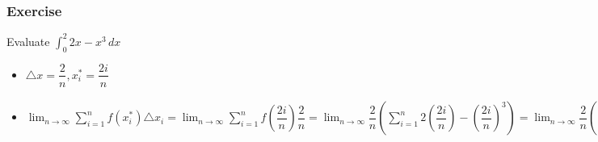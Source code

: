 \documentclass[t]{beamer}
\theoremstyle{plain}
\theoremstyle{definition}
\newcommand{\ds}{\displaystyle}
\begin{document}
\begin{frame}
\frametitle{Exercise}
\footnotesize
Evaluate $\ds\int_0^2 2x - x^3 \, dx$ \pause

\begin{itemize}
	\item $\triangle x = \dfrac{2}{n}, x_i^{*} = \dfrac{2i}{n}$
	\item $\ds \lim_{n\rightarrow \infty} \sum_{i=1}^{n} f(x_{i}^{*})\triangle x_{i} = \lim_{n\rightarrow \infty} \sum_{i=1}^{n} f(\dfrac{2i}{n}) \dfrac{2}{n} =  \lim_{n\rightarrow \infty} \dfrac{2}{n} \left( \sum_{i=1}^{n} 2(\dfrac{2i}{n}) - (\dfrac{2i}{n})^3\right) = \lim_{n\rightarrow \infty} \dfrac{2}{n} \left( \sum_{i=1}^{n} \dfrac{4i}{n} - \dfrac{8i^3}{n^3}\right) = \lim_{n\rightarrow \infty} \dfrac{2}{n} \left( \dfrac{4}{n}\sum_{i=1}^{n} i - \dfrac{8}{n^3}\sum_{i=1}^{n} i^3 \right) = \lim_{n\rightarrow \infty} \dfrac{2}{n} \left( \dfrac{4}{n} \cdot \dfrac{n(n+1)}{2} - \dfrac{8}{n^3} \cdot \left[\dfrac{n(n+1)}{2}\right]^2 \right) = \lim_{n\rightarrow \infty} \dfrac{8}{n^2} \cdot \dfrac{n^2 + n}{2} - \dfrac{16}{n^4} \cdot \dfrac{n^4 + n^3 + n^3 + n^2}{4} = 4 - 4 = 0$
\end{itemize}

\end{frame}
\end{document}
